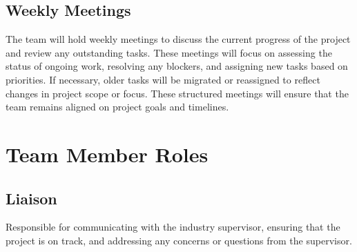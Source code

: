 \documentclass{article}
\begin{document}
\subsection*{Weekly Meetings}
The team will hold weekly meetings to discuss the current progress of the
project and review any outstanding tasks. These meetings will focus on assessing
the status of ongoing work, resolving any blockers, and assigning new tasks
based on priorities. If necessary, older tasks will be migrated or reassigned to
reflect changes in project scope or focus. These structured meetings will ensure
that the team remains aligned on project goals and timelines.

\section{Team Member Roles}

\subsection*{Liaison} Responsible for communicating with the industry
supervisor, ensuring that the project is on track, and addressing any concerns
or questions from the supervisor.   
\end{document}
